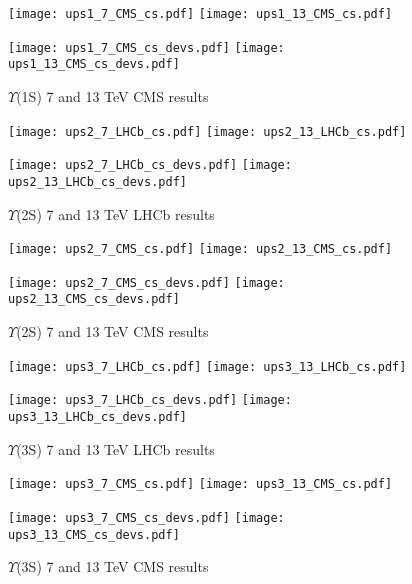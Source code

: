 \documentclass{article}
\begin{document}
\clearpage

\begin{figure}
\centering
\texttt{[image: ups1\_7\_CMS\_cs.pdf]}
\texttt{[image: ups1\_13\_CMS\_cs.pdf]}

\texttt{[image: ups1\_7\_CMS\_cs\_devs.pdf]}
\texttt{[image: ups1\_13\_CMS\_cs\_devs.pdf]}
\caption{$\Upsilon$(1S) 7 and 13 TeV CMS results}
\end{figure}

\clearpage

\begin{figure}
\centering
\texttt{[image: ups2\_7\_LHCb\_cs.pdf]}
\texttt{[image: ups2\_13\_LHCb\_cs.pdf]}

\texttt{[image: ups2\_7\_LHCb\_cs\_devs.pdf]}
\texttt{[image: ups2\_13\_LHCb\_cs\_devs.pdf]}
\caption{$\Upsilon$(2S) 7 and 13 TeV LHCb results}
\end{figure}

\clearpage

\begin{figure}
\centering
\texttt{[image: ups2\_7\_CMS\_cs.pdf]}
\texttt{[image: ups2\_13\_CMS\_cs.pdf]}

\texttt{[image: ups2\_7\_CMS\_cs\_devs.pdf]}
\texttt{[image: ups2\_13\_CMS\_cs\_devs.pdf]}
\caption{$\Upsilon$(2S) 7 and 13 TeV CMS results}
\end{figure}

\clearpage

\begin{figure}
\centering
\texttt{[image: ups3\_7\_LHCb\_cs.pdf]}
\texttt{[image: ups3\_13\_LHCb\_cs.pdf]}

\texttt{[image: ups3\_7\_LHCb\_cs\_devs.pdf]}
\texttt{[image: ups3\_13\_LHCb\_cs\_devs.pdf]}
\caption{$\Upsilon$(3S) 7 and 13 TeV LHCb results}
\end{figure}

\clearpage

\begin{figure}
\centering
\texttt{[image: ups3\_7\_CMS\_cs.pdf]}
\texttt{[image: ups3\_13\_CMS\_cs.pdf]}

\texttt{[image: ups3\_7\_CMS\_cs\_devs.pdf]}
\texttt{[image: ups3\_13\_CMS\_cs\_devs.pdf]}
\caption{$\Upsilon$(3S) 7 and 13 TeV CMS results}
\end{figure}

\clearpage
\restoregeometry


\end{document}
